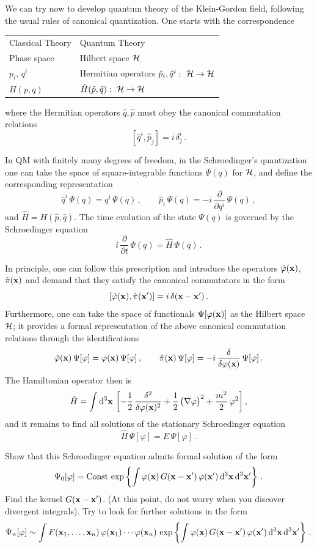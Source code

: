 We can try now to develop quantum theory of the Klein-Gordon field, following
the usual rules of canonical quantization. One starts with the correspondence
\begin{center}
\begin{tabular}{ll}
Classical Theory & Quantum Theory\\[2pt]
Phase space & Hilbert space $\mathcal{H}$\\
$p_i,\,q^i$ & Hermitian operators $\hat p_i,\hat q^i:\ \mathcal{H}\to\mathcal{H}$\\
$H(p,q)$ & $\hat H(\hat p,\hat q):\ \mathcal{H}\to\mathcal{H}$
\end{tabular}
\end{center}
where the Hermitian operators $\hat q,\hat p$ must obey the canonical
commutation relations
\[
[\hat q^i,\hat p_j]=i\,\delta^i_j\,.
\]

\begin{remark}
In QM with finitely many degrees of freedom, in the Schroedinger's
quantization one can take the space of square-integrable functions $\Psi(q)$
for $\mathcal{H}$, and define the corresponding representation
\[
\hat q^i\,\Psi(q)=q^i\,\Psi(q)\,,\qquad
\hat p_i\,\Psi(q)=-i\,\frac{\partial}{\partial q^i}\,\Psi(q)\,,
\]
and $\hat H=H(\hat p,\hat q)$. The time evolution of the state $\Psi(q)$ is
governed by the Schroedinger equation
\[
i\,\frac{\partial}{\partial t}\,\Psi(q)=\hat H\,\Psi(q)\,.
\]
\end{remark}

In principle, one can follow this prescription and introduce the operators
$\hat\varphi(\mathbf{x})$, $\hat\pi(\mathbf{x})$ and demand that they satisfy the canonical
commutators in the form
\[
[\hat\varphi(\mathbf{x}),\hat\pi(\mathbf{x}')]=i\,\delta(\mathbf{x}-\mathbf{x}')\,.
\]
Furthermore, one can take the space of functionals $\Psi[\varphi(\mathbf{x})]$ as
the Hilbert space $\mathcal{H}$; it provides a formal representation of the above
canonical commutation relations through the identifications
\[
\hat\varphi(\mathbf{x})\,\Psi[\varphi]=\varphi(\mathbf{x})\,\Psi[\varphi]\,,\qquad
\hat\pi(\mathbf{x})\,\Psi[\varphi]=-i\,\frac{\delta}{\delta\varphi(\mathbf{x})}\,\Psi[\varphi]\,.
\]
The Hamiltonian operator then is
\[
\hat H=\int \mathop{}\!\mathrm{d}^3\mathbf{x}\,\left[-\frac12\,\frac{\delta^2}{\delta\varphi(\mathbf{x})^2}+\frac12\,\bigl(\nabla\varphi\bigr)^2+\frac{m^2}{2}\,\varphi^2\right],
\]
and it remains to find all solutions of the stationary Schroedinger equation
\[
\hat H\,\Psi[\varphi]=E\,\Psi[\varphi]\,.
\]

\begin{exercise}
Show that this Schroedinger equation admits formal solution of the form
\[
\Psi_0[\varphi]=\text{Const}\,\exp\left\{\int\varphi(\mathbf{x})\,G(\mathbf{x}-\mathbf{x}')\,\varphi(\mathbf{x}')\mathop{}\!\mathrm{d}^3\mathbf{x}\mathop{}\!\mathrm{d}^3\mathbf{x}'\right\}\,.
\]
Find the kernel $G(\mathbf{x}-\mathbf{x}')$. (At this point, do not worry when you discover
divergent integrals). Try to look for further solutions in the form
\[
\Psi_n[\varphi]\sim\int F(\mathbf{x}_1,\dots,\mathbf{x}_n)\,\varphi(\mathbf{x}_1)\cdots\varphi(\mathbf{x}_n)\,
\exp\left\{\int\varphi(\mathbf{x})\,G(\mathbf{x}-\mathbf{x}')\,\varphi(\mathbf{x}')\mathop{}\!\mathrm{d}^3\mathbf{x}\mathop{}\!\mathrm{d}^3\mathbf{x}'\right\}\,.
\]
\end{exercise}

